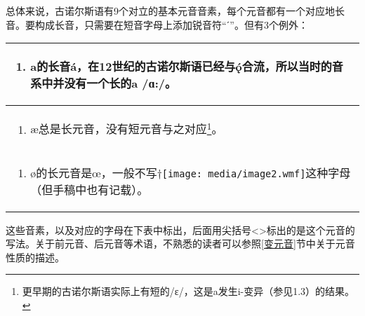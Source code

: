 总体来说，古诺尔斯语有9个对立的基本元音音素，每个元音都有一个对应地长音。要构成长音，只需要在短音字母上添加锐音符``ˊ''。但有3个例外：

\begin{longtable}{l}
  \toprule
  \begin{enumerate}\def\labelenumi{\arabic{enumi}.}\item  a的长音á，在12世纪的古诺尔斯语已经与ǫ́合流，所以当时的音系中并没有一个长的a  /ɑ:/。\end{enumerate} \\
  \midrule
  \endhead
  \bottomrule
  \endfoot
  \begin{minipage}[t]{\linewidth}\raggedright
    \begin{enumerate}
      \def\labelenumi{\arabic{enumi}.}
      \setcounter{enumi}{1}
      \item
            æ总是长元音，没有短元音与之对应\footnote{更早期的古诺尔斯语实际上有短的/ɛ/，这是a发生i-变异（参见1.3）的结果。}。
    \end{enumerate}
  \end{minipage}                                                                                     \\
  \begin{minipage}[t]{\linewidth}\raggedright
    \begin{enumerate}
      \def\labelenumi{\arabic{enumi}.}
      \setcounter{enumi}{2}
      \item
            ø的长元音是œ，一般不写†\texttt{[image: media/image2.wmf]}这种字母（但手稿中也有记载）。
    \end{enumerate}
  \end{minipage}                                                                                     \\
\end{longtable}

这些音素，以及对应的字母在下表中标出，后面用尖括号\textless\textgreater 标出的是这个元音的写法。关于前元音、后元音等术语，不熟悉的读者可以参照\ref{变元音}节中关于元音性质的描述。

